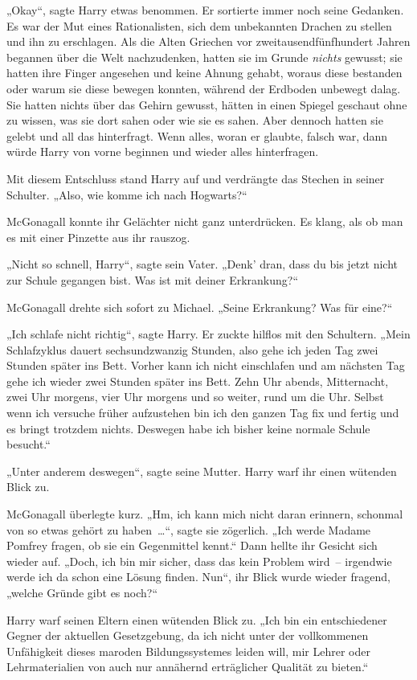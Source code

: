 {„Okay“, sagte Harry etwas benommen. Er sortierte immer noch seine Gedanken. Es war der Mut eines Rationalisten, sich dem unbekannten Drachen zu stellen und ihn zu erschlagen. Als die Alten Griechen vor zweitausendfünfhundert Jahren begannen über die Welt nachzudenken, hatten sie im Grunde \emph{nichts} gewusst; sie hatten ihre Finger angesehen und keine Ahnung gehabt, woraus diese bestanden oder warum sie diese bewegen konnten, während der Erdboden unbewegt dalag. Sie hatten nichts über das Gehirn gewusst, hätten in einen Spiegel geschaut ohne zu wissen, was sie dort sahen oder wie sie es sahen. Aber dennoch hatten sie gelebt und all das hinterfragt. Wenn alles, woran er glaubte, falsch war, dann würde Harry von vorne beginnen und wieder alles hinterfragen.

Mit diesem Entschluss stand Harry auf und verdrängte das Stechen in seiner Schulter. „Also, wie komme ich nach Hogwarts?“

McGonagall konnte ihr Gelächter nicht ganz unterdrücken. Es klang, als ob man es mit einer Pinzette aus ihr rauszog.

„Nicht so schnell, Harry“, sagte sein Vater. „Denk' dran, dass du bis jetzt nicht zur Schule gegangen bist. Was ist mit deiner Erkrankung?“

McGonagall drehte sich sofort zu Michael. „Seine Erkrankung? Was für eine?“

„Ich schlafe nicht richtig“, sagte Harry. Er zuckte hilflos mit den Schultern. „Mein Schlafzyklus dauert sechsundzwanzig Stunden, also gehe ich jeden Tag zwei Stunden später ins Bett. Vorher kann ich nicht einschlafen und am nächsten Tag gehe ich wieder zwei Stunden später ins Bett. Zehn Uhr abends, Mitternacht, zwei Uhr morgens, vier Uhr morgens und so weiter, rund um die Uhr. Selbst wenn ich versuche früher aufzustehen bin ich den ganzen Tag fix und fertig und es bringt trotzdem nichts. Deswegen habe ich bisher keine normale Schule besucht.“

„Unter anderem deswegen“, sagte seine Mutter. Harry warf ihr einen wütenden Blick zu.

McGonagall überlegte kurz. „Hm, ich kann mich nicht daran erinnern, schonmal von so etwas gehört zu haben~…“, sagte sie zögerlich. „Ich werde Madame Pomfrey fragen, ob sie ein Gegenmittel kennt.“ Dann hellte ihr Gesicht sich wieder auf. „Doch, ich bin mir sicher, dass das kein Problem wird~-- irgendwie werde ich da schon eine Lösung finden. Nun“, ihr Blick wurde wieder fragend, „welche Gründe gibt es noch?“

Harry warf seinen Eltern einen wütenden Blick zu. „Ich bin ein entschiedener Gegner der aktuellen Gesetzgebung, da ich nicht unter der vollkommenen Unfähigkeit dieses maroden Bildungssystemes leiden will, mir Lehrer oder Lehrmaterialien von auch nur annähernd erträglicher Qualität zu bieten.“

}

